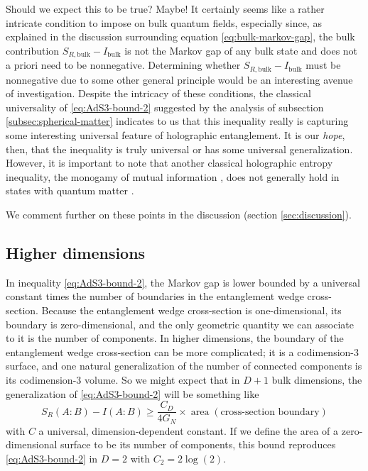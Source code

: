\documentclass[a4paper,11pt]{article}
\newcommand{\area}{\operatorname{area}}
\begin{document}
Should we expect this to be true? Maybe! It certainly seems like a rather intricate condition to impose on bulk quantum fields, especially since, as explained in the discussion surrounding equation \eqref{eq:bulk-markov-gap}, the bulk contribution $S_{R, \text{bulk}} - I_{\text{bulk}}$ is not the Markov gap of any bulk state and does not a priori need to be nonnegative. Determining whether $S_{R, \text{bulk}} - I_{\text{bulk}}$ must be nonnegative due to some other general principle would be an interesting avenue of investigation. Despite the intricacy of these conditions, the classical universality of \eqref{eq:AdS3-bound-2} suggested by the analysis of subsection \ref{subsec:spherical-matter} indicates to us that this inequality really is capturing some interesting universal feature of holographic entanglement. It is our \emph{hope}, then, that the inequality is truly universal or has some universal generalization. However, it is important to note that another classical holographic entropy inequality, the monogamy of mutual information \cite{hayden2013holographic, maximin}, does not generally hold in states with quantum matter \cite{quantum-maximin}.

We comment further on these points in the discussion (section \ref{sec:discussion}).

\subsection{Higher dimensions}
\label{subsec:higher-dimensions}

In inequality \eqref{eq:AdS3-bound-2}, the Markov gap is lower bounded by a universal constant times the number of boundaries in the entanglement wedge cross-section. Because the entanglement wedge cross-section is one-dimensional, its boundary is zero-dimensional, and the only geometric quantity we can associate to it is the number of components. In higher dimensions, the boundary of the entanglement wedge cross-section can be more complicated; it is a codimension-$3$ surface, and one natural generalization of the number of connected components is its codimension-$3$ volume. So we might expect that in $D+1$ bulk dimensions, the generalization of \eqref{eq:AdS3-bound-2} will be something like
\begin{equation} \label{eq:higher-D-inequality}
    S_R(A:B) - I(A:B) \geq \frac{C_{D}}{4 G_N} \times \area(\text{cross-section boundary})
\end{equation}
with $C$ a universal, dimension-dependent constant. If we define the area of a zero-dimensional surface to be its number of components, this bound reproduces \eqref{eq:AdS3-bound-2} in $D=2$ with $C_{2} = 2 \log(2).$
\end{document}
